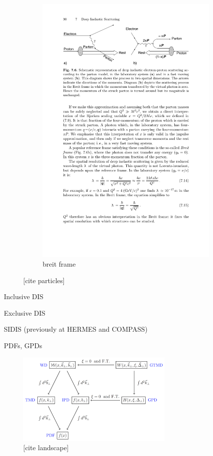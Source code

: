 \begin{figure}[H]
\begin{subfigure}{0.48\linewidth}
        \includegraphics[width=\linewidth]{img/breit_sys.pdf}
        \caption{breit frame}
        \label{fig:eic:dis_kin::breit}
    \end{subfigure}
    \caption{[cite particles]}
    \label{fig:eic:dis_kin}
\end{figure}


Inclusive DIS

Exclusive DIS

SIDIS (previously at HERMES and COMPASS)

PDFs, GPDs

\begin{figure}[H]
    \centering
    \includegraphics[width=.7\linewidth]{img/landscape.png}
    \caption{[cite landscape]}
    \label{fig:physics:landscape}
\end{figure}

